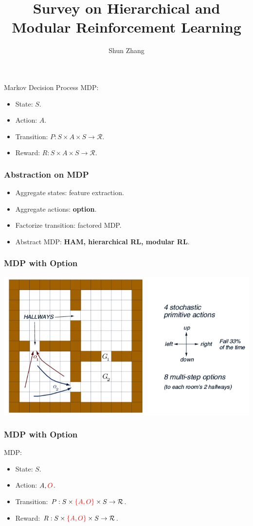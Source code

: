 \documentclass{beamer}
\title{Survey on Hierarchical and Modular Reinforcement Learning}
\author{Shun Zhang}
\begin{document}
\begin{frame}
\titlepage
\end{frame}

\begin{frame}{Markov Decision Process}
MDP:
\begin{itemize}
\item State: $S$.
\item Action: $A$.
\item Transition: $P: S \times A \times S \rightarrow \mathcal{R}$.
\item Reward: $R: S \times A \times S \rightarrow \mathcal{R}$.
\end{itemize}
\end{frame}

\begin{frame}
\frametitle{Abstraction on MDP}
\begin{itemize}
  \item Aggregate states: feature extraction. \pause
  \item Aggregate actions: {\bf option}. \pause
  \item Factorize transition: factored MDP. \pause
  \item Abstract MDP: {\bf HAM, hierarchical RL, modular RL}.
\end{itemize}
\end{frame}

\begin{frame}
\frametitle{MDP with Option}
\includegraphics[width=0.8\columnwidth]{option.png}
\end{frame}

\begin{frame}
\frametitle{MDP with Option}
MDP:
\begin{itemize}
  \item State: $S$.
  \item Action: $A, {\color{red}O}$.
  \item Transition: $P: S \times {\color{red}\{A, O\}} \times S \rightarrow \mathcal{R}$.
  \item Reward: $R: S \times {\color{red}\{A, O\}} \times S \rightarrow \mathcal{R}$.
\end{itemize}
\end{frame}
\end{document}
